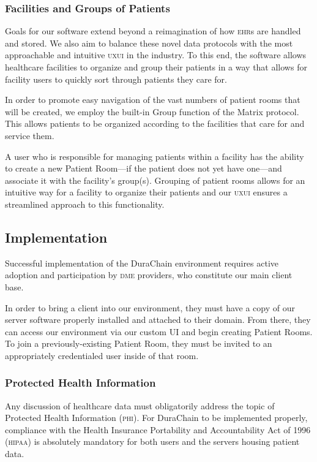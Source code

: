 \subsubsection{Facilities and Groups of Patients}
Goals for our software extend beyond a reimagination of how \textsc{ehr}s are handled and stored. We also aim to balance these novel data protocols with the most approachable and intuitive \textsc{uxui} in the industry. To this end, the software allows healthcare facilities to organize and group their patients in a way that allows for facility users to quickly sort through patients they care for.%

In order to promote easy navigation of the vast numbers of patient rooms that will be created, we employ the built-in Group function of the Matrix protocol. This allows patients to be organized according to the facilities that care for and service them.%

A user who is responsible for managing patients within a facility has the ability to create a new Patient Room---if the patient does not yet have one---and associate it with the facility's group(s). Grouping of patient rooms allows for an intuitive way for a facility to organize their patients and our \textsc{uxui} ensures a streamlined approach to this functionality.%

 \subsection{Implementation}
 Successful implementation of the DuraChain environment requires active adoption and participation by \textsc{dme} providers, who constitute our main client base.%

 In order to bring a client into our environment, they must have a copy of our server software properly installed and attached to their domain. From there, they can access our environment via our custom UI and begin creating Patient Rooms. To join a previously-existing Patient Room, they must be invited to an appropriately credentialed user inside of that room.%

\subsubsection{Protected Health Information}
Any discussion of healthcare data must obligatorily address the topic of Protected Health Information (\textsc{phi}). For DuraChain to be implemented properly, compliance with the Health Insurance Portability and Accountability Act of 1996 (\textsc{hipaa})\cite{HIPAA} is absolutely mandatory for both users and the servers housing patient data.%


